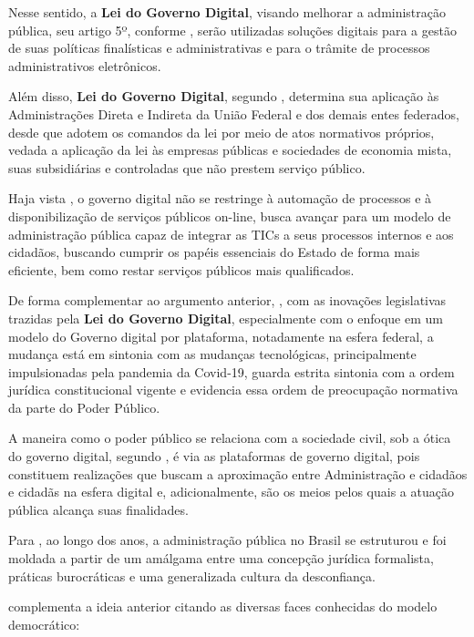Nesse sentido, a \textbf{Lei do Governo Digital}, visando melhorar a administração pública, seu artigo 5º, conforme \cite{l14129}, serão utilizadas soluções digitais para a gestão de suas políticas finalísticas e administrativas e para o trâmite de processos administrativos eletrônicos.

Além disso, \textbf{Lei do Governo Digital}, segundo \cite{l14129}, determina sua aplicação às Administrações Direta e Indireta da União Federal e dos demais entes federados, desde que adotem os comandos da lei por meio de atos normativos próprios, vedada a aplicação da lei às empresas públicas e sociedades de economia mista, suas subsidiárias e controladas que não prestem serviço público.

Haja vista \cite{reck2021transformaccao}, o governo digital não se restringe à automação de processos e à disponibilização de serviços públicos on-line, busca avançar para um modelo de administração pública capaz de integrar as TICs a seus processos internos e aos cidadãos, buscando cumprir os papéis essenciais do Estado de forma mais eficiente, bem como restar serviços públicos mais qualificados. 

De forma complementar ao argumento anterior, \cite{lima2023governo}, com as inovações legislativas trazidas pela \textbf{Lei do Governo Digital}, especialmente com o enfoque em um modelo do Governo digital por plataforma, notadamente na esfera federal, a mudança está em sintonia com as mudanças tecnológicas, principalmente impulsionadas pela pandemia da Covid-19, guarda estrita sintonia com a ordem jurídica constitucional vigente e evidencia essa ordem de preocupação normativa da parte do Poder Público.

A maneira como o poder público se relaciona com a sociedade civil, sob a ótica do governo digital, segundo  \cite{lima2023governo}, é via as plataformas de governo digital, pois constituem realizações que buscam a aproximação entre Administração e cidadãos e cidadãs na esfera digital e, adicionalmente, são os meios pelos quais a atuação pública alcança suas finalidades.

Para \cite{de2020governo}, ao longo dos anos, a administração pública no Brasil se estruturou e foi moldada a partir de um amálgama entre uma concepção jurídica formalista, práticas burocráticas e uma generalizada cultura da desconfiança. 

\cite{de2020governo} complementa a ideia anterior citando as diversas faces 
conhecidas do modelo democrático:  

